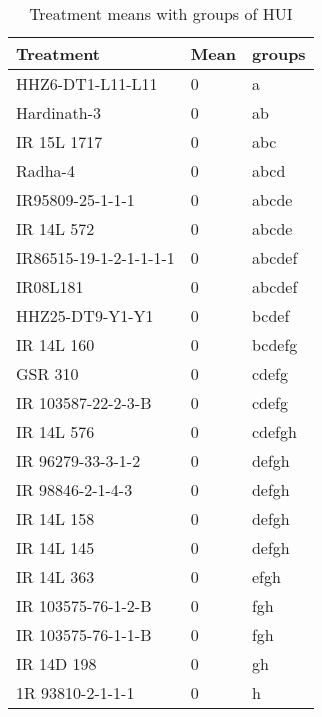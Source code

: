\documentclass[]{article}
\begin{document}
\begin{longtable}{lll}
\caption{\label{tab:two-fac-groups-tab-agroclimate-early}Treatment means with groups of HUI}\\
\toprule
Treatment & Mean & groups\\
\midrule
\rowcolor{gray!6}  HHZ6-DT1-L11-L11 & 0 & a\\
Hardinath-3 & 0 & ab\\
\rowcolor{gray!6}  IR 15L 1717 & 0 & abc\\
Radha-4 & 0 & abcd\\
\rowcolor{gray!6}  IR95809-25-1-1-1 & 0 & abcde\\
\addlinespace
IR 14L 572 & 0 & abcde\\
\rowcolor{gray!6}  IR86515-19-1-2-1-1-1-1 & 0 & abcdef\\
IR08L181 & 0 & abcdef\\
\rowcolor{gray!6}  HHZ25-DT9-Y1-Y1 & 0 & bcdef\\
IR 14L 160 & 0 & bcdefg\\
\addlinespace
\rowcolor{gray!6}  GSR 310 & 0 & cdefg\\
IR 103587-22-2-3-B & 0 & cdefg\\
\rowcolor{gray!6}  IR 14L 576 & 0 & cdefgh\\
IR 96279-33-3-1-2 & 0 & defgh\\
\rowcolor{gray!6}  IR 98846-2-1-4-3 & 0 & defgh\\
\addlinespace
IR 14L 158 & 0 & defgh\\
\rowcolor{gray!6}  IR 14L 145 & 0 & defgh\\
IR 14L 363 & 0 & efgh\\
\rowcolor{gray!6}  IR 103575-76-1-2-B & 0 & fgh\\
IR 103575-76-1-1-B & 0 & fgh\\
\addlinespace
\rowcolor{gray!6}  IR 14D 198 & 0 & gh\\
1R 93810-2-1-1-1 & 0 & h\\
\bottomrule
\end{longtable}
\endgroup{}
\begingroup\fontsize{12}{14}\selectfont
\end{document}
